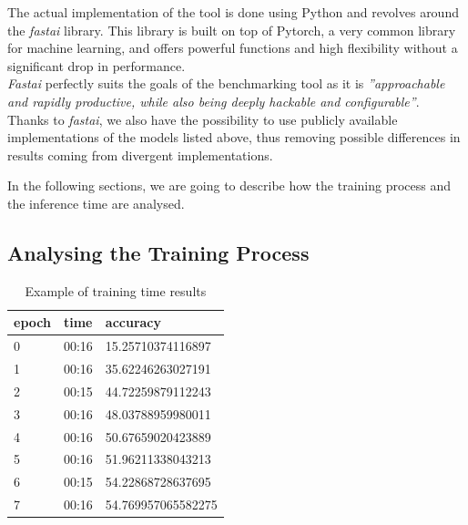 The actual implementation of the tool is done using Python and revolves around the \textit{fastai} library. This library is built on top of Pytorch, a very common library for machine learning, and offers powerful functions and high flexibility without a significant drop in performance. \cite{fastai}\\
\textit{Fastai} perfectly suits the goals of the benchmarking tool as it is \textit{''approachable and rapidly productive, while also being deeply hackable and configurable''}. \cite{fastai}\\
Thanks to \textit{fastai}, we also have the possibility to use publicly available implementations of the models listed above, thus removing possible differences in results coming from divergent implementations. 

In the following sections, we are going to describe how the training process and the inference time are analysed. 

\subsection{Analysing the Training Process}\label{sec:training_process_bench}

\begin{table}[h]
\centering
\begin{tabular}{ p{2cm} p{2cm} p{3.5cm} }
 epoch&time&accuracy\\
 \hline
0&00:16&15.25710374116897\\
1&00:16&35.62246263027191\\
2&00:15&44.72259879112243\\
3&00:16&48.03788959980011\\
4&00:16&50.67659020423889\\
5&00:16&51.96211338043213\\
6&00:15&54.22868728637695\\
7&00:16&54.769957065582275\\
 \hline
\end{tabular}
\caption[Example of training time results]{Example of training time results}
\label{tab:m_fast_time}
\end{table}


